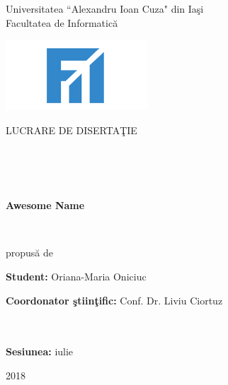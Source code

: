 \documentclass[11pt]{report}
\theoremstyle{plain}
\theoremstyle{definition}
\theoremstyle{definition}
\theoremstyle{proposition}
\begin{document}
\begin{titlepage}

\begin{center}
\begin{large}
Universitatea ``Alexandru Ioan Cuza" din Iaşi\\
Facultatea de Informatică\\
\end{large}
\end{center}

\vspace{50mm}

\begin{center}
\includegraphics{fii.png}
\end{center}
 
\vspace{15mm}

\begin{center}
\begin{Large}
LUCRARE DE DISERTAŢIE
\end{Large}
\\
\
\\
\
\

\begin{Huge}
\textbf{Awesome Name}
\end{Huge}

\

propusă de

\end{center}

\vspace{30mm}

\textbf{Student:} Oriana-Maria Oniciuc

\textbf{Coordonator ştiinţific:} Conf. Dr. Liviu Ciortuz
\\
\
\\
\


\vfill

\begin{center}
\textbf{Sesiunea:} iulie

2018
\end{center}

\end{titlepage}
\newpage
\end{document}
